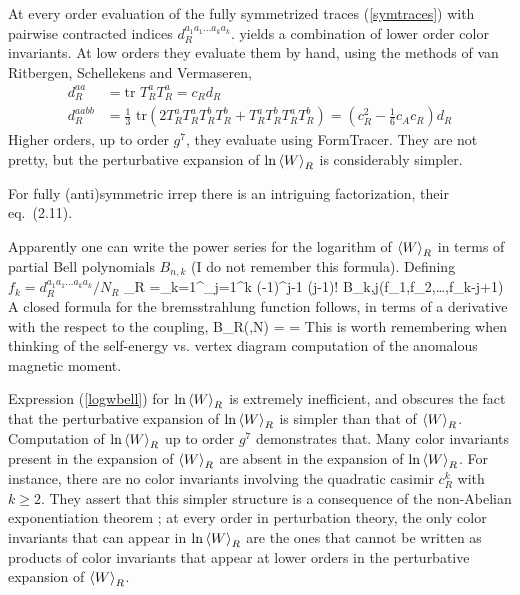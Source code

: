 At every order evaluation of the fully symmetrized traces
(\ref{symtraces}) with pairwise contracted indices $d_R^{a_1 a_1\dots a_k
a_k}$. yields a combination of lower order color invariants. At low
orders they evaluate them by hand, using the methods of van Ritbergen,
Schellekens and Vermaseren,
\begin{align*}
d_R^{aa} & =  \text{tr } T_R^a T_R^a= c_R d_R \\
d_R^{aabb} & =  \frac{1}{3}\text{ tr}
\left(2T_R^aT_R^aT_R^bT_R^b+T_R^aT_R^bT_R^aT_R^b\right)
=(c_R^2-\frac{1}{6}c_A c_R)d_R
\end{align*}
Higher orders, up to order $g^{7}$, they evaluate using
FormTracer. They are not pretty, but the perturbative
expansion of $\ln {\left< {W} \right>}_R$ is considerably simpler.

For  fully (anti)symmetric irrep
there is an intriguing factorization, their eq.~(2.11).

Apparently one can write the power series for the logarithm of
${\left< {W} \right>}_R$ in terms of partial Bell polynomials $B_{n,k}$ (I do not
remember this formula). Defining $f_k=d_R^{a_1a_1\dots a_k a_k}/N_R$
\beq
\ln {}_R =\sum_{k=1}^\infty {}\sum_{j=1}^k
               (-1)^{j-1} (j-1)! B_{k,j}(f_1,f_2,\dots,f_{k-j+1})
A closed formula for the bremsstrahlung function follows, in terms of a
derivative with the respect to the coupling,
\beq
B_R(\lambda,N)
=\lambda {}
= \cdots
{}
This is worth remembering when thinking of the self-energy vs. vertex
diagram computation of the anomalous magnetic moment.

Expression (\ref{logwbell}) for $\ln {\left< {W} \right>}_R$ is extremely inefficient,
and obscures the fact that the perturbative expansion of $\ln {\left< {W} \right>}_R$
is simpler than that of ${\left< {W} \right>}_R$. Computation of $\ln {\left< {W} \right>}_R$ up to
order $g^{7}$ demonstrates that.
Many color invariants present in the expansion of ${\left< {W} \right>}_R$ are absent
in the expansion of $\ln {\left< {W} \right>}_R$. For instance, there are no color
invariants involving the quadratic casimir $c_R^k$ with $k\geq 2$. They
assert that this
simpler structure is a consequence of the non-Abelian exponentiation
theorem%
; at every order in
perturbation theory, the only color invariants that can appear in $\ln
{\left< {W} \right>}_R$ are the ones that cannot be written as products of color
invariants that appear at lower orders in the perturbative expansion of
${\left< {W} \right>}_R$.

